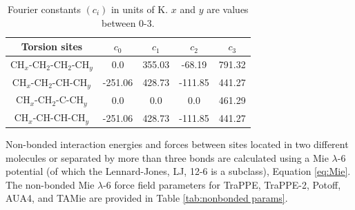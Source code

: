 \documentclass[preprint,review,12pt]{elsarticle}
\begin{document}
	\begin{table}[h!]
		\caption{Fourier constants $(c_i)$ in units of K. $x$ and $y$ are values between 0-3.} \label{tab:torsions}
		\begin{center}
			\begin{tabular}{|c|c|c|c|c|}
				\hline
				Torsion sites & $c_0$ & $c_1$ & $c_2$ & $c_3$ \\ \hline
				CH$_x$-CH$_2$-CH$_2$-CH$_y$ & 0.0 & 355.03 & -68.19 & 791.32 \\ 
				CH$_x$-CH$_2$-CH-CH$_y$ & -251.06 & 428.73 & -111.85 & 441.27 \\
				CH$_x$-CH$_2$-C-CH$_y$ & 0.0 & 0.0 & 0.0 & 461.29 \\
				CH$_x$-CH-CH-CH$_y$ & -251.06 & 428.73 & -111.85 & 441.27 \\
				\hline
			\end{tabular}
		\end{center} 
	\end{table}
	Non-bonded interaction energies and forces between sites located in two different molecules or separated by more than three bonds are calculated using a Mie $\lambda$-6 potential (of which the Lennard-Jones, LJ, 12-6 is a subclass), Equation \ref{eq:Mie}. The non-bonded Mie $\lambda$-6 force field parameters for TraPPE, TraPPE-2, Potoff, AUA4, and TAMie are provided in Table \ref{tab:nonbonded params}. 
	
\end{document}
